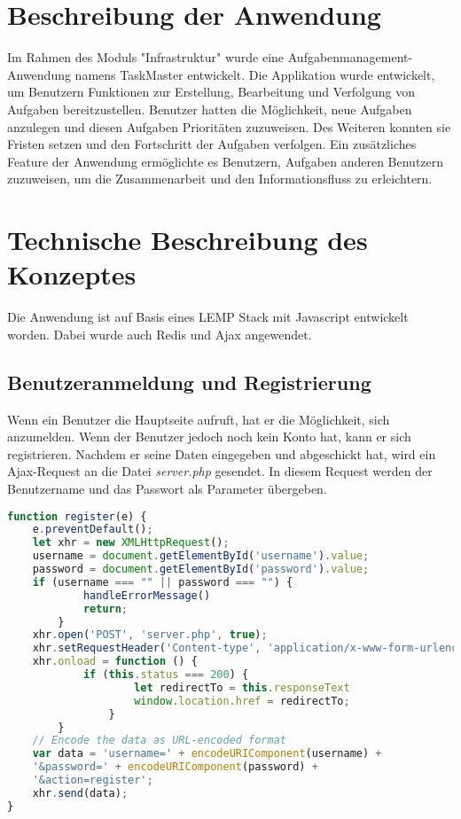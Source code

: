 \section{Beschreibung der Anwendung}
Im Rahmen des Moduls "Infrastruktur" wurde eine Aufgabenmanagement-Anwendung namens TaskMaster entwickelt. Die Applikation wurde entwickelt, um Benutzern Funktionen zur Erstellung, Bearbeitung und Verfolgung von Aufgaben bereitzustellen. Benutzer hatten die Möglichkeit, neue Aufgaben anzulegen und diesen Aufgaben Prioritäten zuzuweisen. Des Weiteren konnten sie Fristen setzen und den Fortschritt der Aufgaben verfolgen. Ein zusätzliches Feature der Anwendung ermöglichte es Benutzern, Aufgaben anderen Benutzern zuzuweisen, um die Zusammenarbeit und den Informationsfluss zu erleichtern.

\section{Technische Beschreibung des Konzeptes}
Die Anwendung ist auf Basis eines LEMP Stack mit Javascript entwickelt worden. Dabei wurde auch Redis und Ajax angewendet.
\subsection{Benutzeranmeldung und Registrierung}
Wenn ein Benutzer die Hauptseite aufruft, hat er die Möglichkeit, sich anzumelden. Wenn der Benutzer jedoch noch kein Konto hat, kann er sich registrieren. Nachdem er seine Daten eingegeben und abgeschickt hat, wird ein Ajax-Request an die Datei \emph{server.php} gesendet. In diesem Request werden der Benutzername und das Passwort als Parameter übergeben.

\begin{lstlisting}[language=Javascript, caption=Ajax Request für die Registrierung eines neues Benutzers]
function register(e) {
    e.preventDefault();
    let xhr = new XMLHttpRequest();
    username = document.getElementById('username').value;
    password = document.getElementById('password').value;
    if (username === "" || password === "") {
            handleErrorMessage()
            return;
        }
    xhr.open('POST', 'server.php', true);
    xhr.setRequestHeader('Content-type', 'application/x-www-form-urlencoded');
    xhr.onload = function () {
            if (this.status === 200) {
                    let redirectTo = this.responseText
                    window.location.href = redirectTo;
                }
        }
    // Encode the data as URL-encoded format
    var data = 'username=' + encodeURIComponent(username) +
    '&password=' + encodeURIComponent(password) +
    '&action=register';
    xhr.send(data);
}
\end{lstlisting}


